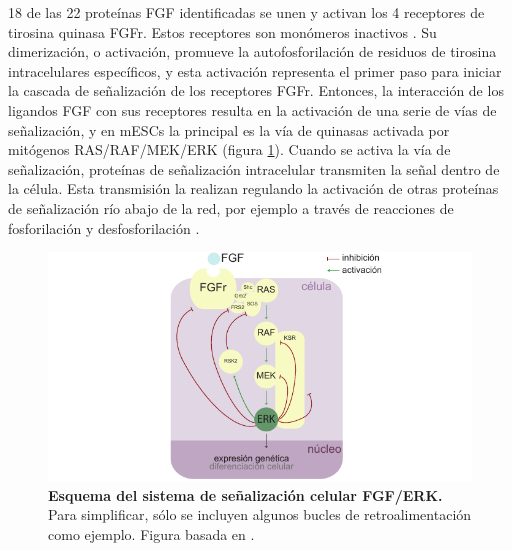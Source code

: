 \documentclass[./main.tex]{subfiles}
\begin{document}
18 de las 22 proteínas FGF identificadas se unen y activan los 4 receptores de tirosina quinasa FGFr. Estos receptores son monómeros inactivos \cite{Schlessinger2000}. Su dimerización, o activación, promueve la autofosforilación de residuos de tirosina intracelulares específicos, y esta activación representa el primer paso para iniciar la cascada de señalización de los receptores FGFr. Entonces, la interacción de los ligandos FGF con sus receptores resulta en la activación de una serie de vías de señalización, y en mESCs la principal es la vía de quinasas activada por mitógenos RAS/RAF/MEK/ERK (figura \ref{C1_fig:FGF_ERK_pathway}). Cuando se activa la vía de señalización, proteínas de señalización intracelular transmiten la señal dentro de la célula. Esta transmisión la realizan regulando la activación de otras proteínas de señalización río abajo de la red, por ejemplo a través de reacciones de fosforilación y desfosforilación \cite{Johnson1996}. 


 \begin{figure}
    \centering
    \includegraphics[width=1\columnwidth]{figures/chapter1/C1_FGF-ERK_pathway.pdf} 
    \caption{\textbf{Esquema del sistema de señalización celular FGF/ERK.} Para simplificar, sólo se incluyen algunos bucles de retroalimentación como ejemplo. Figura basada en \cite{Lake2016}.}
    \label{C1_fig:FGF_ERK_pathway}
\end{figure}
\end{document}
